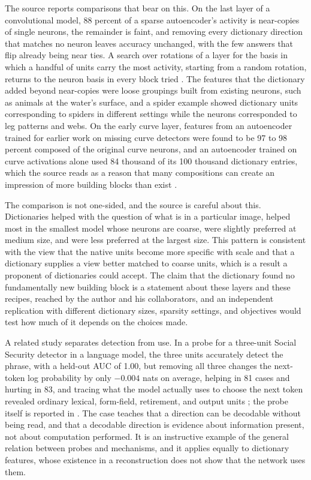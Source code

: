 \documentclass[11pt]{article}
\begin{document}
The source reports comparisons that bear on this. On the last layer of a convolutional model, 88 percent of a sparse autoencoder's activity is near-copies of single neurons, the remainder is faint, and removing every dictionary direction that matches no neuron leaves accuracy unchanged, with the few answers that flip already being near ties. A search over rotations of a layer for the basis in which a handful of units carry the most activity, starting from a random rotation, returns to the neuron basis in every block tried \cite[\emph{What Dictionaries Learn}]{cammarata}. The features that the dictionary added beyond near-copies were loose groupings built from existing neurons, such as animals at the water's surface, and a spider example showed dictionary units corresponding to spiders in different settings while the neurons corresponded to leg patterns and webs. On the early curve layer, features from an autoencoder trained for earlier work on missing curve detectors \cite{gorton2024} were found to be 97 to 98 percent composed of the original curve neurons, and an autoencoder trained on curve activations alone used 84 thousand of its 100 thousand dictionary entries, which the source reads as a reason that many compositions can create an impression of more building blocks than exist \cite[\emph{Missing Curves}]{cammarata}.

The comparison is not one-sided, and the source is careful about this. Dictionaries helped with the question of what is in a particular image, helped most in the smallest model whose neurons are coarse, were slightly preferred at medium size, and were less preferred at the largest size. This pattern is consistent with the view that the native units become more specific with scale and that a dictionary supplies a view better matched to coarse units, which is a result a proponent of dictionaries could accept. The claim that the dictionary found no fundamentally new building block is a statement about these layers and these recipes, reached by the author and his collaborators, and an independent replication with different dictionary sizes, sparsity settings, and objectives would test how much of it depends on the choices made.

A related study separates detection from use. In a probe for a three-unit Social Security detector in a language model, the three units accurately detect the phrase, with a held-out AUC of 1.00, but removing all three changes the next-token log probability by only $-0.004$ nats on average, helping in 81 cases and hurting in 83, and tracing what the model actually uses to choose the next token revealed ordinary lexical, form-field, retirement, and output units \cite[\emph{Social Security: Detection and Use}]{cammarata}; the probe itself is reported in \cite{gurnee2023}. The case teaches that a direction can be decodable without being read, and that a decodable direction is evidence about information present, not about computation performed. It is an instructive example of the general relation between probes and mechanisms, and it applies equally to dictionary features, whose existence in a reconstruction does not show that the network uses them.
\end{document}
